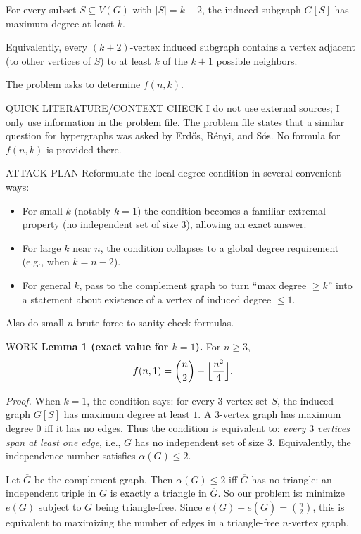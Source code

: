 \medskip
\noindent For every subset $S\subseteq V(G)$ with $|S|=k+2$, the induced subgraph
$G[S]$ has maximum degree at least $k$.

Equivalently, every $(k+2)$-vertex induced subgraph contains a vertex adjacent
(to other vertices of $S$) to at least $k$ of the $k+1$ possible neighbors.

The problem asks to determine $f(n,k)$.

QUICK LITERATURE/CONTEXT CHECK
I do not use external sources; I only use information in the problem file.
The problem file states that a similar question for hypergraphs was asked by
Erd\H{o}s, R\'enyi, and S\'os.
No formula for $f(n,k)$ is provided there.

ATTACK PLAN
Reformulate the local degree condition in several convenient ways:
\begin{itemize}
\item For small $k$ (notably $k=1$) the condition becomes a familiar extremal
property (no independent set of size $3$), allowing an exact answer.
\item For large $k$ near $n$, the condition collapses to a global degree
requirement (e.g., when $k=n-2$).
\item For general $k$, pass to the complement graph to turn ``max degree $\ge k$''
into a statement about existence of a vertex of induced degree $\le1$.
\end{itemize}
Also do small-$n$ brute force to sanity-check formulas.

WORK
\textbf{Lemma 1 (exact value for $k=1$).}
For $n\ge 3$,
\[
 f(n,1)=\binom{n}{2}-\Bigl\lfloor\frac{n^2}{4}\Bigr\rfloor.
\]

\emph{Proof.}
When $k=1$, the condition says:
for every $3$-vertex set $S$, the induced graph $G[S]$ has maximum degree at
least $1$. A $3$-vertex graph has maximum degree $0$ iff it has no edges.
Thus the condition is equivalent to: \emph{every $3$ vertices span at least one
edge}, i.e., $G$ has no independent set of size $3$.
Equivalently, the independence number satisfies $\alpha(G)\le2$.

Let $\overline{G}$ be the complement graph. Then $\alpha(G)\le2$ iff
$\overline{G}$ has no triangle: an independent triple in $G$ is exactly a
triangle in $\overline{G}$.
So our problem is:
minimize $e(G)$ subject to $\overline{G}$ being triangle-free.
Since $e(G)+e(\overline{G})=\binom{n}{2}$, this is equivalent to maximizing the
number of edges in a triangle-free $n$-vertex graph.


